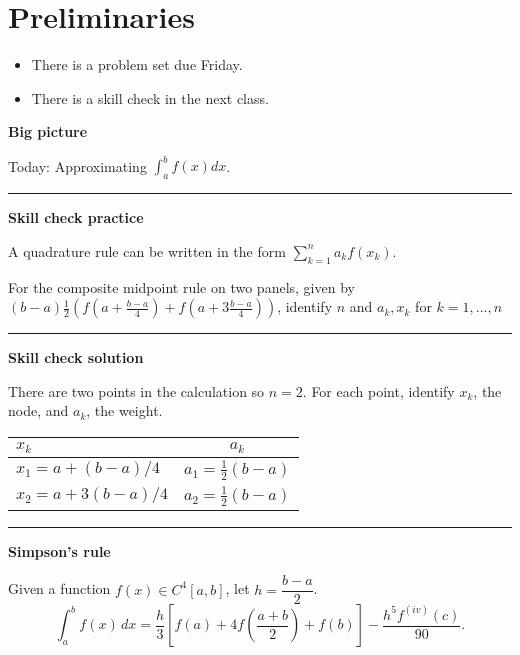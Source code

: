 \documentclass[12pt,letterpaper,noanswers]{exam}
\begin{document}
 \pdfpageheight 11in 
  \pdfpagewidth 8.5in

\noindent 

\section*{Preliminaries}

\begin{itemize}
\itemsep0pt
\item There is a problem set due Friday.
\item There is a skill check in the next class.
\end{itemize}


\noindent\textbf{Big picture}

Today: Approximating $\int_{a}^{b}f(x)dx$.

\vspace{0.2cm}
\hrule
\vspace{0.2cm}

\noindent \textbf{Skill check practice}

 A quadrature rule can be written in the form $\sum\limits_{k=1}^n a_k f(x_k)$.

For the composite midpoint rule on two panels, given by $(b-a)\frac{1}{2}\left(f(a + \frac{b-a}{4})+ f(a + 3\frac{b-a}{4})\right)$, identify $n$ and $a_k, x_k$ for $k=1,...,n$




\vspace{0.2cm}
\hrule
\vspace{0.2cm}

\noindent \textbf{Skill check solution}

There are two points in the calculation so $n = 2$.  For each point, identify $x_k$, the node, and $a_k$, the weight.

\begin{tabular}{| l|  c|}
\hline
$x_k$ & $a_k$ \\
\hline
$x_1 = a+(b-a)/4$ & $a_1 = \frac{1}{2}(b-a)$ \\
$x_2 = a+3(b-a)/4$ & $a_2 = \frac{1}{2}(b-a)$ \\
\hline
\end{tabular}


\vspace{0.2cm}
\hrule
\vspace{0.2cm}


\begin{tcolorbox}
\noindent\textbf{Simpson's rule}

Given a function $f(x) \in C^4[a,b]$, let $h = \dfrac{b-a}{2}$.
\[
          \int_{a}^{b} f(x) \, dx = \frac{h}{3}\left[ f(a)+4f\left(\dfrac{a+b}{2}\right) + f(b) \right]
          - \frac{h^5f^{(iv)}(c)}{90}.\]
\end{tcolorbox}
\end{document}
